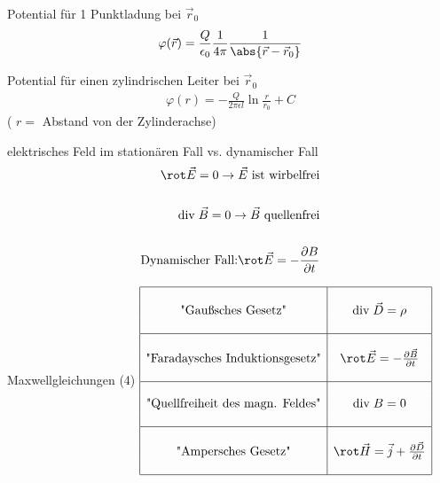 \documentclass[a6paper]{kartei}
\renewcommand{\div}{\mathrm{div}\;}
\begin{document}
\setlength{\parindent}{0pt} %
	\begin{karte}[Grundwissen]{Potential für 1 Punktladung bei $\vec r_0$}
		\begin{eqnarray*}
			\varphi (\vec r ) = \frac{Q}{\epsilon_0} \frac{1}{4 \pi} \frac{1}{\abs{\vec r - \vec r_0}}
		\end{eqnarray*}
	\end{karte}


	\begin{karte}[Grundwissen]{Potential für einen zylindrischen Leiter bei $\vec r_0$}
		\begin{eqnarray*}
			\varphi (r ) = - \frac{Q}{2 \pi \epsilon l} \ln \frac{r}{r_0} + C
		\end{eqnarray*}
		( $r = $ Abstand von der Zylinderachse)
	\end{karte}


	\begin{karte}[Grundwissen]
	{elektrisches Feld im stationären Fall vs. dynamischer Fall}
		\begin{eqnarray*}
			\rot \vec E = 0 \rightarrow\vec E \ \text{ist wirbelfrei}\\\\
			\div \vec B = 0 \rightarrow \vec B \ \text{quellenfrei}\\\\
			\text{Dynamischer Fall:} \rot \vec E = - \frac{\partial B}{\partial t}
		\end{eqnarray*}
	\end{karte}

	\begin{karte}{Maxwellgleichungen (4)}
		$\begin{array}{|c|c|}
			\hline &\\
			\text{"Gaußsches Gesetz"}&\div \vec D = \rho \\&\\\hline &\\
			\text{"Faradaysches Induktionsgesetz"}&\rot \vec E = - \frac{\partial \vec B}{\partial t} \\&\\\hline &\\
			\text{"Quellfreiheit des magn. Feldes"}&\div B = 0 \\&\\\hline &\\
			\text{"Ampersches Gesetz"}&\rot \vec H = \vec j + \frac{\partial \vec D}{\partial t}
			\\&\\\hline
		\end{array}$
	\end{karte}
\end{document}
